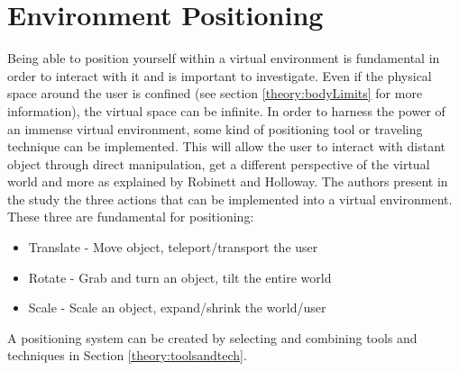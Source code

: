 \section{Environment Positioning}
Being able to position yourself within a virtual environment is fundamental in order to interact with it and is important to investigate.\cite{tools:warren2014perception} Even if the physical space around the user is confined (see section \ref{theory:bodyLimits} for more information), the virtual space can be infinite. In order to harness the power of an immense virtual environment, some kind of positioning tool or traveling technique can be implemented. This will allow the user to interact with distant object through direct manipulation, get a different perspective of the virtual world and more as explained by Robinett and Holloway. \cite{positioning:Robinett1992} The authors present in the study the three actions that can be implemented into a virtual environment. These three are fundamental for positioning:
\begin{itemize}
  \item Translate - Move object, teleport/transport the user
  \item Rotate - Grab and turn an object, tilt the entire world
  \item Scale - Scale an object, expand/shrink the world/user
\end{itemize}

A positioning system can be created by selecting and combining tools and techniques in Section \ref{theory:toolsandtech}.
